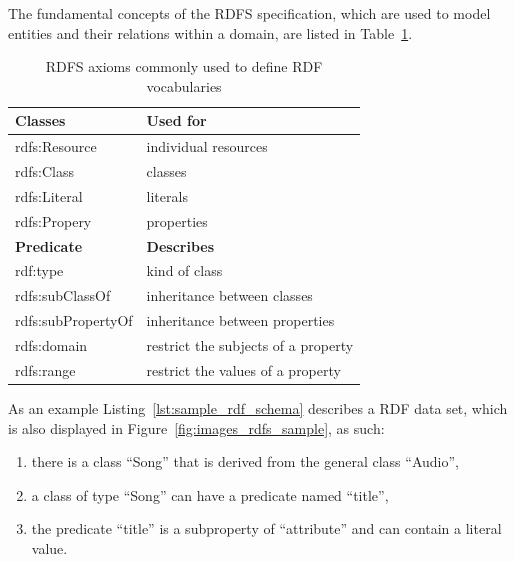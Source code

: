 The fundamental concepts of the \gls{RDFS} specification, which are used to model entities and their relations within a domain, are listed in Table~\ref{tab:w3c_vocab_rdfs}.

\begin{table}[H]
\centering
\begin{tabular}{p{5cm}p{7cm}}
\hline
\textbf{Classes} & \textbf{Used for} \\
\hline
rdfs:Resource & individual resources \\
\hline
rdfs:Class & classes \\
\hline
rdfs:Literal & literals \\
\hline
rdfs:Propery & properties \\
\hline
\textbf{Predicate} & \textbf{Describes} \\
\hline
rdf:type	& kind of class \\
\hline
rdfs:subClassOf 	&	inheritance between classes \\
\hline
rdfs:subPropertyOf 	& inheritance between properties \\
\hline
rdfs:domain	&	restrict the subjects of a property \\
\hline
rdfs:range  & restrict the values of a property \\
\hline
\end{tabular}
\caption[\gls{RDFS} axioms commonly used to define \gls{RDF} vocabularies]{\gls{RDFS} axioms commonly used to define \gls{RDF} vocabularies \citep[pg. 46-49]{antoniou2012semantic}}
\label{tab:w3c_vocab_rdfs}
\end{table}

As an example Listing~\ref{lst:sample_rdf_schema} describes a \gls{RDF} data set, which is also displayed in Figure~\ref{fig:images_rdfs_sample}, as such: \@

\begin{enumerate}
	\item there is a class ``Song'' that is derived from the general class ``Audio'',
	\item a class of type ``Song'' can have a predicate named ``title'',
	\item the predicate ``title'' is a subproperty of ``attribute'' and can contain a literal value.
\end{enumerate}



